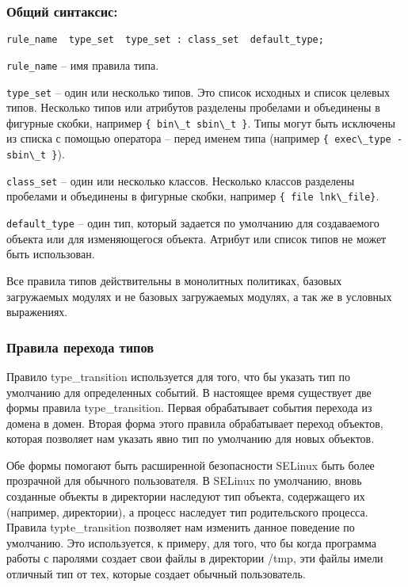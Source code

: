 \documentclass{./../class/UIR}
\begin{document}
\subsubsection{Общий синтаксис:}
\begin{verbatim}
rule_name  type_set  type_set : class_set  default_type;
\end{verbatim}
    \begin{description}
      \item \verb"rule_name" – имя правила типа.
      \item \verb"type_set" – один или несколько типов. Это список исходных и
      список целевых типов. Несколько типов или атрибутов разделены пробелами и
      объединены в фигурные скобки, например \verb"{ bin\_t sbin\_t }". Типы
      могут быть исключены из списка с помощью оператора – перед именем типа
      (например \verb"{ exec\_type -sbin\_t }").
      \item \verb"class_set" – один или несколько классов. Несколько классов
      разделены пробелами и объединены в фигурные скобки, например
      \verb"{ file lnk\_file}".
      \item \verb"default_type" – один тип, который задается по умолчанию для
      создаваемого объекта или для изменяющегося объекта. Атрибут или список
      типов не может быть использован.
    \end{description}

    Все правила типов действительны в монолитных политиках, базовых загружаемых
    модулях и не базовых загружаемых модулях, а так же в условных выражениях.

\subsubsection{Правила перехода типов}

    Правило type\_transition используется для того, что бы указать тип по
    умолчанию для определенных событий. В настоящее время существует две формы
    правила type\_transition. Первая обрабатывает события перехода из домена в
    домен. Вторая форма этого правила обрабатывает переход объектов, которая
    позволяет нам указать явно тип по умолчанию для новых объектов.

    Обе формы помогают быть расширенной безопасности SELinux быть более
    прозрачной для обычного пользователя. В SELinux по умолчанию, вновь
    созданные объекты в директории наследуют тип объекта, содержащего их
    (например, директории), а процесс наследует тип родительского процесса.
    Правила typte\_transition позволяет нам изменить данное поведение по
    умолчанию. Это используется, к примеру, для того, что бы когда программа
    работы с паролями создает свои файлы в директории /tmp, эти файлы имели
    отличный тип от тех, которые создает обычный пользователь.
\end{document}
